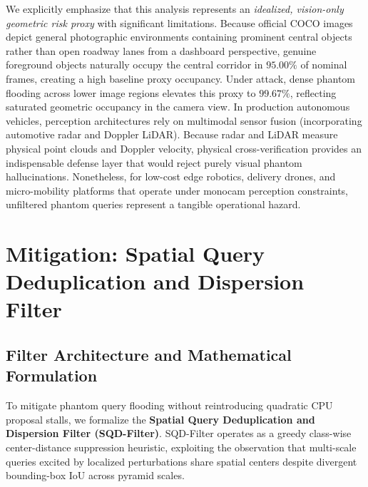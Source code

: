 \documentclass[preprint,12pt]{elsarticle}
\begin{document}
We explicitly emphasize that this analysis represents an \textit{idealized, vision-only geometric risk proxy} with significant limitations. Because official COCO images depict general photographic environments containing prominent central objects rather than open roadway lanes from a dashboard perspective, genuine foreground objects naturally occupy the central corridor in $95.00\%$ of nominal frames, creating a high baseline proxy occupancy. Under attack, dense phantom flooding across lower image regions elevates this proxy to $99.67\%$, reflecting saturated geometric occupancy in the camera view. In production autonomous vehicles, perception architectures rely on multimodal sensor fusion (incorporating automotive radar and Doppler LiDAR). Because radar and LiDAR measure physical point clouds and Doppler velocity, physical cross-verification provides an indispensable defense layer that would reject purely visual phantom hallucinations. Nonetheless, for low-cost edge robotics, delivery drones, and micro-mobility platforms that operate under monocam perception constraints, unfiltered phantom queries represent a tangible operational hazard.

\section{Mitigation: Spatial Query Deduplication and Dispersion Filter}
\label{sec:defense}

\subsection{Filter Architecture and Mathematical Formulation}
To mitigate phantom query flooding without reintroducing quadratic CPU proposal stalls, we formalize the \textbf{Spatial Query Deduplication and Dispersion Filter (SQD-Filter)}. SQD-Filter operates as a greedy class-wise center-distance suppression heuristic, exploiting the observation that multi-scale queries excited by localized perturbations share spatial centers despite divergent bounding-box IoU across pyramid scales.
\end{document}
